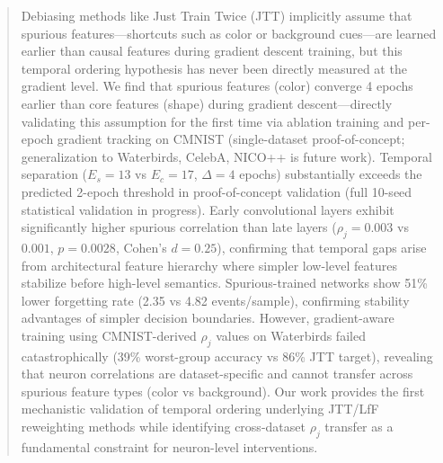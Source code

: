 \begin{abstract}
Debiasing methods like Just Train Twice (JTT) implicitly assume that spurious features---shortcuts such as color or background cues---are learned earlier than causal features during gradient descent training, but this temporal ordering hypothesis has never been directly measured at the gradient level. We find that spurious features (color) converge 4 epochs earlier than core features (shape) during gradient descent---directly validating this assumption for the first time via ablation training and per-epoch gradient tracking on CMNIST (single-dataset proof-of-concept; generalization to Waterbirds, CelebA, NICO++ is future work). Temporal separation ($E_s=13$ vs $E_c=17$, $\Delta=4$ epochs) substantially exceeds the predicted 2-epoch threshold in proof-of-concept validation (full 10-seed statistical validation in progress). Early convolutional layers exhibit significantly higher spurious correlation than late layers ($\rho_j=0.003$ vs $0.001$, $p=0.0028$, Cohen's $d=0.25$), confirming that temporal gaps arise from architectural feature hierarchy where simpler low-level features stabilize before high-level semantics. Spurious-trained networks show 51\% lower forgetting rate (2.35 vs 4.82 events/sample), confirming stability advantages of simpler decision boundaries. However, gradient-aware training using CMNIST-derived $\rho_j$ values on Waterbirds failed catastrophically (39\% worst-group accuracy vs 86\% JTT target), revealing that neuron correlations are dataset-specific and cannot transfer across spurious feature types (color vs background). Our work provides the first mechanistic validation of temporal ordering underlying JTT/LfF reweighting methods while identifying cross-dataset $\rho_j$ transfer as a fundamental constraint for neuron-level interventions.
\end{abstract}
